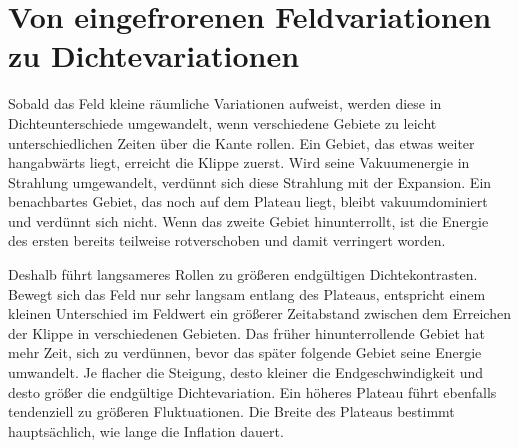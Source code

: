\begin{classroomqa}
\end{classroomqa}

\begin{classroomqa}
\end{classroomqa}

\section{Von eingefrorenen Feldvariationen zu Dichtevariationen}

Sobald das Feld kleine räumliche Variationen aufweist, werden diese in Dichteunterschiede umgewandelt, wenn verschiedene Gebiete zu leicht unterschiedlichen Zeiten über die Kante rollen. Ein Gebiet, das etwas weiter hangabwärts liegt, erreicht die Klippe zuerst. Wird seine Vakuumenergie in Strahlung umgewandelt, verdünnt sich diese Strahlung mit der Expansion. Ein benachbartes Gebiet, das noch auf dem Plateau liegt, bleibt vakuumdominiert und verdünnt sich nicht. Wenn das zweite Gebiet hinunterrollt, ist die Energie des ersten bereits teilweise rotverschoben und damit verringert worden.

Deshalb führt langsameres Rollen zu größeren endgültigen Dichtekontrasten. Bewegt sich das Feld nur sehr langsam entlang des Plateaus, entspricht einem kleinen Unterschied im Feldwert ein größerer Zeitabstand zwischen dem Erreichen der Klippe in verschiedenen Gebieten. Das früher hinunterrollende Gebiet hat mehr Zeit, sich zu verdünnen, bevor das später folgende Gebiet seine Energie umwandelt. Je flacher die Steigung, desto kleiner die Endgeschwindigkeit und desto größer die endgültige Dichtevariation. Ein höheres Plateau führt ebenfalls tendenziell zu größeren Fluktuationen. Die Breite des Plateaus bestimmt hauptsächlich, wie lange die Inflation dauert.

